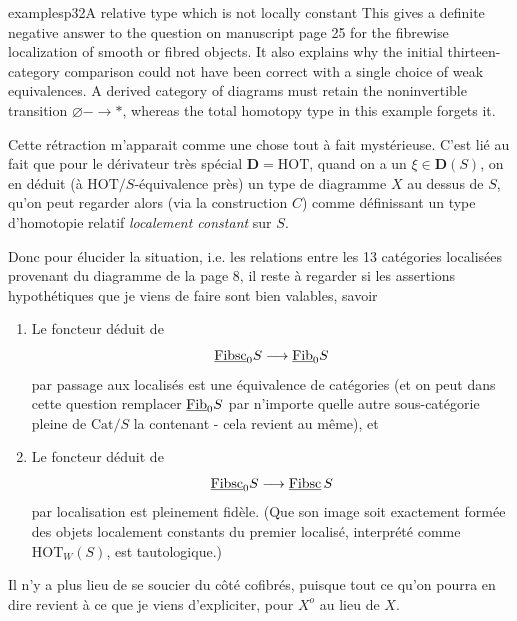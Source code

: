\begin{dcomment}{examples}{p32}{A relative type which is not locally constant}
This gives a definite negative answer to the question on manuscript page 25 for the fibrewise localization of smooth or fibred objects. It also explains why the initial thirteen-category comparison could not have been correct with a single choice of weak equivalences. A derived category of diagrams must retain the noninvertible transition \ensuremath{\varnothing}\ensuremath{-}\ensuremath{\to}\ensuremath{*}, whereas the total homotopy type in this example forgets it.

\end{dcomment}


Cette rétraction m'apparait comme une chose tout à fait mystérieuse. C'est lié au fait que pour le dérivateur très spécial $\mathbf{D} = \mathrm{HOT}$, quand on a un $\xi \in \mathbf{D}(S)$, on en déduit (à $\mathrm{HOT}/S$-équivalence près) un type de diagramme $X$ au dessus de $S$,
qu'on peut regarder alors (via la construction $C$) comme définissant un type d'homotopie relatif \textit{localement constant} sur $S$.


Donc pour élucider la situation, i.e. les relations entre les 13 catégories localisées provenant du diagramme de la page 8, il reste à regarder si les assertions hypothétiques que je viens de faire sont bien valables, savoir

\begin{enumerate}[leftmargin=*]
\item[\circled{$1^o$}] Le foncteur déduit de
\[
\underline{\mathrm{Fibsc}}_0 S \longrightarrow \underline{\mathrm{Fib}}_0 S
\]
par passage aux localisés est une équivalence de catégories (et on peut dans cette question remplacer $\underline{\mathrm{Fib}}_0 S$ par n'importe quelle autre sous-catégorie pleine de $\mathrm{Cat}/S$ la contenant - cela revient au même), et

\item[\circled{$2^o$}] Le foncteur déduit de
\[
\underline{\mathrm{Fibsc}}_0 S \longrightarrow \underline{\mathrm{Fibsc}}\, S
\]
par localisation est pleinement fidèle. (Que son image soit exactement formée des objets localement constants du premier localisé, interprété comme $\mathrm{HOT}_W(S)$, est tautologique.)
\end{enumerate}

Il n'y a plus lieu de se soucier du côté
cofibrés, puisque tout ce qu'on pourra en dire revient à ce que je viens d'expliciter, pour $X^o$ au lieu de $X$.

